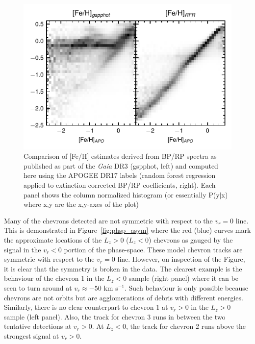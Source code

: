 \documentclass[a4paper,useAMS,usenatbib]{mnras}
\begin{document}
%
\begin{figure}
    \centering
    \includegraphics{img/feh_plot.pdf}
    \caption{Comparison of [Fe/H] estimates derived from BP/RP spectra as published as part of the {\it Gaia} DR3 (gspphot, left) and computed here using the APOGEE DR17 labels (random forest regression applied to extinction corrected BP/RP coefficients, right).  Each panel shows the column normalized histogram (or essentially P(y$|$x) where x,y are the x,y-axes of the plot)}
    \label{fig:feh_measurements}
\end{figure}
%

Many of the chevrons detected are not symmetric with respect to the $v_r=0$ line. This is demonstrated in Figure~\ref{fig:phsp_asym} where the red (blue) curves mark the approximate locations of the $L_z>0$ ($L_z<0$) chevrons as gauged by the signal in the $v_r<0$ portion of the phase-space. These model chevron tracks are symmetric with respect to the $v_r=0$ line. However, on inspection of the Figure, it is clear that the symmetry is broken in the data. The clearest example is the behaviour of the chevron 1 in the $L_z<0$ sample (right panel) where it can be seen to turn around at $v_r\approx-50$ km s$^{-1}$. Such behaviour is only possible because chevrons are not orbits but are agglomerations of debris with different energies. Similarly, there is no clear counterpart to chevron 1 at $v_r>0$ in the $L_z>0$ sample (left panel). Also, the track for chevron 3 runs in between the two tentative detections at $v_r>0$. At $L_z<0$, the track for chevron 2 runs above the strongest signal at $v_r>0$. 
\end{document}

